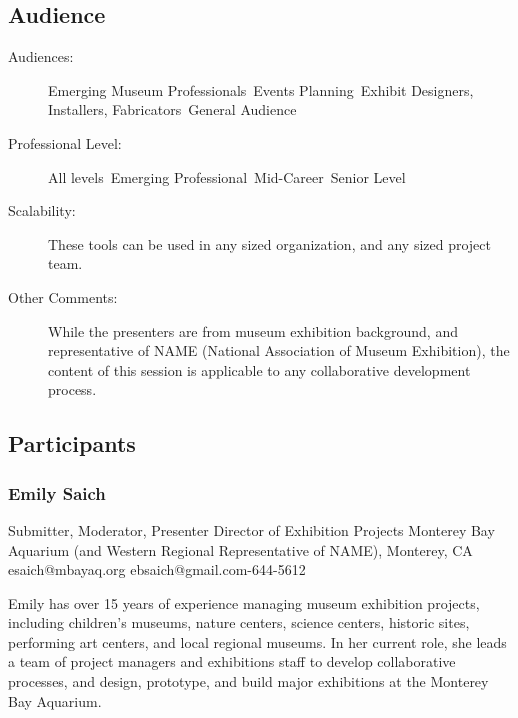 \documentclass{report}
\begin{document}
              \subsection*{Audience}
                \begin{description}
                  \item [Audiences:]Emerging Museum Professionals~Events Planning~Exhibit Designers, Installers, Fabricators~General Audience~
                  \item[Professional Level:]All levels~Emerging Professional~Mid-Career~Senior Level~
                \item[Scalability:] These tools can be used in any sized organization, and any sized project team.

							
              \item[Other Comments:] While the presenters are from museum exhibition background, and representative of NAME (National Association of Museum Exhibition), the content of this session is applicable to any collaborative development process.
              \end{description}
            \subsection*{Participants}
              \subsubsection*{ Emily Saich }
              Submitter, Moderator, Presenter\newline
              Director of Exhibition Projects\newline
              Monterey Bay Aquarium (and Western Regional Representative of NAME), Monterey, CA
              \newline
              esaich@mbayaq.org\newline
              ebsaich@gmail.com-644-5612\newline

              Emily has over 15 years of experience managing museum exhibition projects, including children’s museums, nature centers, science centers, historic sites, performing art centers, and local regional museums. In her current role, she leads a team of project managers and exhibitions staff to develop collaborative processes, and design, prototype, and build major exhibitions at the Monterey Bay Aquarium.\newline
\end{document}
